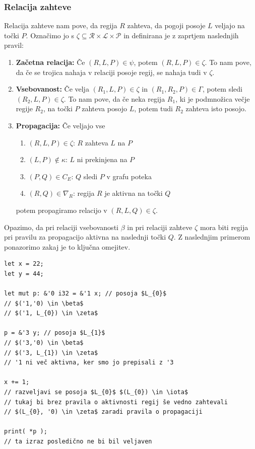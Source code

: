 \documentclass[a4paper,12pt,openright]{book}
\begin{document}
\subsubsection{Relacija zahteve}

Relacija zahteve nam pove, da regija $R$ zahteva, da pogoji posoje $L$ veljajo na točki $P$. Označimo jo s
$\zeta \subseteq \mathcal{R} \times \mathcal{L} \times \mathcal{P}$ in definirana je z zaprtjem naslednjih pravil:
\begin{enumerate}
	\item \textbf{Začetna relacija:} Če $(R, L, P) \in \psi$, potem $(R, L, P) \in \zeta$. To nam pove, da če se trojica
	      nahaja v relaciji posoje regij, se nahaja tudi v $\zeta$.
	\item \textbf{Vsebovanost:} Če velja $(R_{1}, L, P) \in \zeta$ in $(R_{1}, R_{2}, P) \in \Gamma$, potem sledi
	      $(R_{2}, L, P) \in \zeta$. To nam pove, da če neka regija $R_{1}$, ki je podmnožica večje regije $R_{2}$, na točki $P$
	      zahteva posojo $L$, potem tudi $R_{2}$ zahteva isto posojo.
	\item \textbf{Propagacija:} Če veljajo vse \begin{enumerate}
		      \item $(R,L,P) \in \zeta$: $R$ zahteva $L$ na $P$
		      \item $(L, P) \notin \kappa$: $L$ ni prekinjena na $P$
		      \item $(P, Q) \in C_{E}$: $Q$ sledi $P$ v grafu poteka
		      \item $(R,Q) \in \nabla_{R}$: regija $R$ je aktivna na točki $Q$
	      \end{enumerate}
	      potem propagiramo relacijo v $(R,L,Q) \in \zeta$.
\end{enumerate}

Opazimo, da pri relaciji vsebovanosti $\beta$ in pri relaciji zahteve $\zeta$ mora biti regija pri pravilu
za propagacijo aktivna na naslednji točki $Q$. Z naslednjim primerom ponazorimo zakaj je to ključna omejitev.

\begin{listing}[!ht]
	\begin{verbatim}
let x = 22;
let y = 44;

let mut p: &'0 i32 = &'1 x; // posoja $L_{0}$
// $('1,'0) \in \beta$
// $('1, L_{0}) \in \zeta$

p = &'3 y; // posoja $L_{1}$
// $('3,'0) \in \beta$
// $('3, L_{1}) \in \zeta$
// '1 ni več aktivna, ker smo jo prepisali z '3 

x += 1;
// razveljavi se posoja $L_{0}$ $(L_{0}) \in \iota$
// tukaj bi brez pravila o aktivnosti regij še vedno zahtevali 
// $(L_{0}, '0) \in \zeta$ zaradi pravila o propagaciji 

print( *p );
// ta izraz posledično ne bi bil veljaven
\end{verbatim}
	\caption{Primer relacije zahteve}
	\label{listing:reqRelation}
\end{listing}
\end{document}

